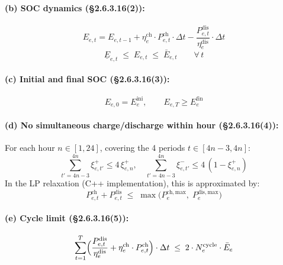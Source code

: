 \paragraph{(b) SOC dynamics (§2.6.3.16(2)):}
\begin{equation}\label{eq:soc-dynamics}
  E_{e,t} = E_{e,t-1}
  + \eta^{\mathrm{ch}}_e \cdot P^{\mathrm{ch}}_{e,t} \cdot \Delta t
  - \frac{P^{\mathrm{dis}}_{e,t}}{\eta^{\mathrm{dis}}_e} \cdot \Delta t
\end{equation}
\begin{equation}\label{eq:soc-limits}
  \underline{E}_{e,t} \;\leq\; E_{e,t} \;\leq\; \bar{E}_{e,t}
  \qquad \forall\, t
\end{equation}

\paragraph{(c) Initial and final SOC (§2.6.3.16(3)):}
\begin{equation}\label{eq:soc-init-final}
  E_{e,0} = E^{\mathrm{ini}}_e, \qquad
  E_{e,T} \geq E^{\mathrm{fin}}_e
\end{equation}

\paragraph{(d) No simultaneous charge/discharge within hour (§2.6.3.16(4)):}
For each hour $n \in [1, 24]$, covering the 4 periods $t \in [4n-3, 4n]$:
\begin{equation}\label{eq:sto-hourly}
  \sum_{t'=4n-3}^{4n} \xi^{+}_{e,t'} \leq 4\,\xi^{+}_{e,n}, \quad
  \sum_{t'=4n-3}^{4n} \xi^{-}_{e,t'} \leq 4\,(1-\xi^{+}_{e,n})
\end{equation}
In the LP relaxation (C++ implementation), this is approximated by:
\begin{equation}\label{eq:sto-simul}
  P^{\mathrm{ch}}_{e,t} + P^{\mathrm{dis}}_{e,t}
  \;\leq\;
  \max\!\bigl(P^{\mathrm{ch,max}}_e,\; P^{\mathrm{dis,max}}_e\bigr)
\end{equation}

\paragraph{(e) Cycle limit (§2.6.3.16(5)):}
\begin{equation}\label{eq:sto-cycle}
  \sum_{t=1}^{T}
  \Bigl(\frac{P^{\mathrm{dis}}_{e,t}}{\eta^{\mathrm{dis}}_e}
  + \eta^{\mathrm{ch}}_e \cdot P^{\mathrm{ch}}_{e,t}\Bigr) \cdot \Delta t
  \;\leq\;
  2 \cdot N^{\mathrm{cycle}}_e \cdot \bar{E}_e
\end{equation}

